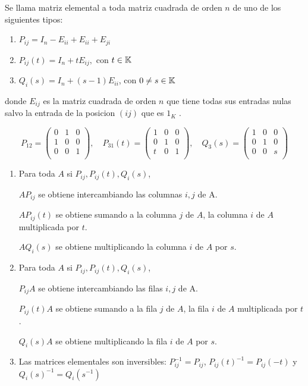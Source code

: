\begin{definition}
	Se llama matriz elemental a toda matriz cuadrada de orden \(n \) de uno de los siguientes tipos:
	\begin{enumerate}
		\item \(P_{ij } = I_n - E_{ii} + E_{ii} + E_{ji}\)
		\item \(P_{ij}(t) = I_n + tE_{ij},\) con \(t \in \mathbb{K} \)
		\item \(Q_i(s) = I_n + (s-1)E_{ii}\), con \(0 \neq s \in  \mathbb{K} \)
	\end{enumerate}
	donde \(E_{ij }\) es la matriz cuadrada de orden \(n \) que tiene todas sus entradas nulas salvo la entrada de la posicion \((ij)\) que es \(1_K \) .
\end{definition}
\begin{example}
	\[
		P_{12} = \begin{pmatrix}
			0 & 1 & 0 \\
			1 & 0 & 0 \\
			0 & 0 & 1 \\
		\end{pmatrix}, \quad P_{31}(t) = \begin{pmatrix}
			1 & 0 & 0 \\
			0 & 1 & 0 \\
			t & 0 & 1 \\
		\end{pmatrix}, \quad Q_3(s) = \begin{pmatrix}
			1 & 0 & 0 \\
			0 & 1 & 0 \\
			0 & 0 & s \\
		\end{pmatrix}
	\]
\end{example}

\begin{proposition}
	\begin{enumerate}
		\item Para toda \(A \) si \(P_{ij},P_{ij}(t), Q_i(s)\),

		      \(AP_{ij}\) se obtiene intercambiando las columnas \(i,j \) de A.

		      \(AP_{ij}(t)\) se obtiene sumando a la columna \(j \) de \(A \), la columna \(i \) de \(A \) multiplicada por \(t \).

		      \(AQ_i (s)\) se obtiene multiplicando la columna \(i \) de \(A  \) por \(s\).

		\item Para toda \(A \) si \(P_{ij},P_{ij}(t), Q_i(s)\),

		      \(P_{ij}A\) se obtiene intercambiando las filas \(i,j \) de A.

		      \(P_{ij}(t)A\) se obtiene sumando a la fila \(j \) de \(A \), la fila \(i \) de \(A \) multiplicada por \(t \).

		      \(Q_i (s)A\) se obtiene multiplicando la fila \(i \) de \(A  \) por \(s\).
		\item Las matrices elementales son inversibles: \(P_{ij}^{-1} = P_{ij}\), \(P_{ij}(t)^{-1} = P_{ij}(-t)\) y \(Q_{i}(s)^{-1}  = Q_i(s^{-1})\)
	\end{enumerate}
\end{proposition}

